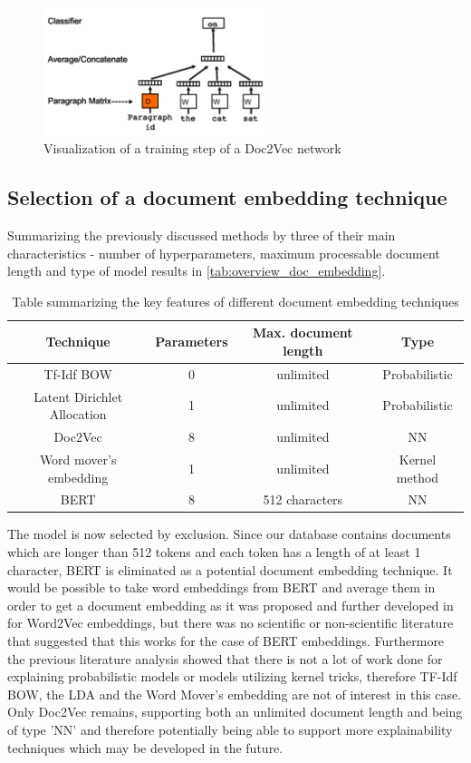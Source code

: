 \begin{figure}[t]
	\centering
	\includegraphics[width=250px]{../chapters/implementation/pics/doc2vec}
	\caption{\label{pic:doc2vec} Visualization of a training step of a Doc2Vec network {\cite{wuWordMoverEmbedding2018}}}
\end{figure}

\subsection{Selection of a document embedding technique}

Summarizing the previously discussed methods by three of their main characteristics - number of hyperparameters, maximum processable document length and type of model results in  \autoref{tab:overview_doc_embedding}.
\begin{table}
	\centering
	\begin{tabular}{ c | c | c | c }
		\hline 
		Technique & Parameters & Max. document length & Type \\ \hline
		Tf-Idf BOW & 0 & unlimited & Probabilistic \\ \hline
		Latent Dirichlet Allocation & 1 & unlimited & Probabilistic \\ \hline
		Doc2Vec & 8 & unlimited & NN \\ \hline
		Word mover's embedding & 1 & unlimited & Kernel method \\ \hline
		BERT & 8 & 512 characters & NN \\ \hline
	\end{tabular}
	\caption{\label{tab:overview_doc_embedding} Table summarizing the key features of different document embedding techniques}
\end{table}

The model is now selected by exclusion. Since our database contains documents which are longer than 512 tokens and each token has a length of at least 1 character, BERT is eliminated as a potential document embedding technique. It would be possible to take word embeddings from BERT and average them in order to get a document embedding as it was proposed and further developed in \cite{deboomRepresentationLearningVery2016} for Word2Vec embeddings, but there was no scientific or non-scientific literature that suggested that this works for the case of BERT embeddings. 
Furthermore the previous literature analysis showed that there is not a lot of work done for explaining probabilistic models or models utilizing kernel tricks, therefore TF-Idf BOW, the LDA and the Word Mover's embedding are not of interest in this case. Only Doc2Vec remains, supporting both an unlimited document length and being of type 'NN' and therefore potentially being able to support more explainability techniques which may be developed in the future.

